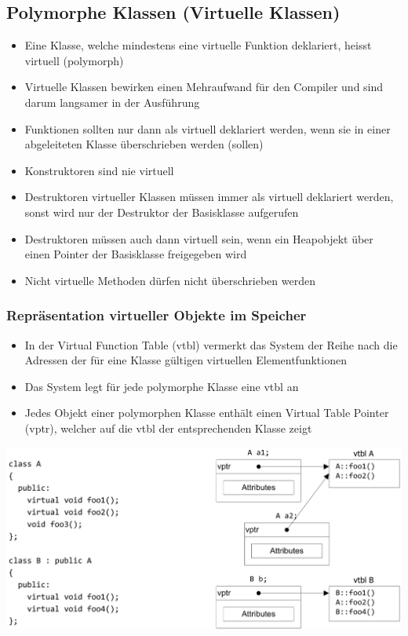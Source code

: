 \subsection{Polymorphe Klassen (Virtuelle Klassen)}
\begin{itemize}
	\item Eine Klasse, welche mindestens eine virtuelle Funktion deklariert, heisst virtuell (polymorph)
	\item Virtuelle Klassen bewirken einen Mehraufwand für den Compiler und sind darum langsamer in der Ausführung
	\item Funktionen sollten nur dann als virtuell deklariert werden, wenn sie in einer abgeleiteten Klasse überschrieben werden (sollen)
	\item Konstruktoren sind nie virtuell
	\item Destruktoren virtueller Klassen müssen immer als virtuell deklariert werden, sonst wird nur der Destruktor der Basisklasse aufgerufen
	\item Destruktoren müssen auch dann virtuell sein, wenn ein Heapobjekt über einen Pointer der Basisklasse freigegeben wird
	\item Nicht virtuelle Methoden dürfen nicht überschrieben werden	
\end{itemize}

\subsubsection{Repräsentation virtueller Objekte im Speicher}
\begin{minipage}{0.45\linewidth}
	\begin{itemize}
		\item In der Virtual Function Table (vtbl) vermerkt das System der Reihe nach die Adressen der für eine Klasse gültigen virtuellen Elementfunktionen
		\item Das System legt für jede polymorphe Klasse eine vtbl an
		\item Jedes Objekt einer polymorphen Klasse enthält einen Virtual Table Pointer (vptr), welcher auf die vtbl der entsprechenden Klasse zeigt
	\end{itemize}
\end{minipage}%
\hfill
\begin{minipage}{0.55\linewidth}
	\includegraphics[width=\linewidth]{images/vtbl.png}
\end{minipage}

